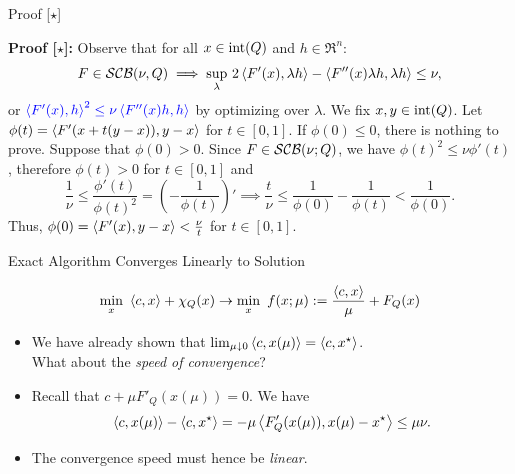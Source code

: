 \documentclass[9pt]{beamer}
\begin{document}
\begin{frame}{Proof [$\star$]}

  \textbf{Proof [$\star$]:} Observe that for all $x\in \operatorname{int}(Q)$ and $h\in \Re^n$:
  \[
    F \in \mathcal{SCB}(\nu, Q) \implies \sup_\lambda \, 2\left<F'(x), \lambda h\right> - \left<F''(x) \lambda h, \lambda h\right> \leq \nu,
  \]
  or ${\color{blue} \left<F'(x), h\right>^2 \leq \nu \left<F''(x)h, h\right>}$ by optimizing over $\lambda$. We fix $x, y \in \operatorname{int}(Q)$. Let $\phi(t) = \left<F'(x + t(y-x)), y-x\right>$ for $t\in[0, 1]$. If $\phi(0)\leq 0$, there is nothing to prove. Suppose that $\phi(0) > 0$. Since $F\in \mathcal{SCB}(\nu;Q)$, we have $\phi(t)^2\leq \nu \phi'(t)$, therefore $\phi(t)>0$ for $t\in[0, 1]$ and
  \[
    \frac{1}{\nu} \leq \frac{\phi'(t)}{\phi(t)^2} = \left(-\frac{1}{\phi(t)}\right)' \implies \frac{t}{\nu} \leq \frac{1}{\phi(0)}-\frac{1}{\phi(t)}<\frac{1}{\phi(0)}.
  \]
  Thus, $\phi(0) = \left<F'(x), y-x\right> < \frac{\nu}{t}$ for $t\in [0, 1]$.

\end{frame}

\begin{frame}{Exact Algorithm Converges Linearly to Solution}

  \begin{center}
    \begin{tcolorbox}[width=0.7\textwidth]
      \[
        \min_x ~\left<c, x\right> + \chi_Q(x) \to \min_{x} ~f(x; \mu):= \frac{\left<c, x\right>}{\mu} + F_Q(x)
      \]
    \end{tcolorbox}
  \end{center}

  \vfill

  \begin{itemize}
    \setlength\itemsep{1em}
  \item We have already shown that $\lim_{\mu\downarrow 0}\left<c, x(\mu)\right> = \left<c, x^\star\right>$. \\ What about the \emph{speed of convergence}?
    
  \item<2-> Recall that $c+\mu F'_Q(x(\mu))=0$. We have
    \[
      \left<c, x(\mu)\right>-\left<c, x^\star\right> = -\mu \left<F'_Q(x(\mu)), x(\mu)-x^\star\right>\leq \mu \nu.
    \]
  \item<2-> The convergence speed must hence be \emph{linear}.
  \end{itemize}
\end{frame}
\end{document}
